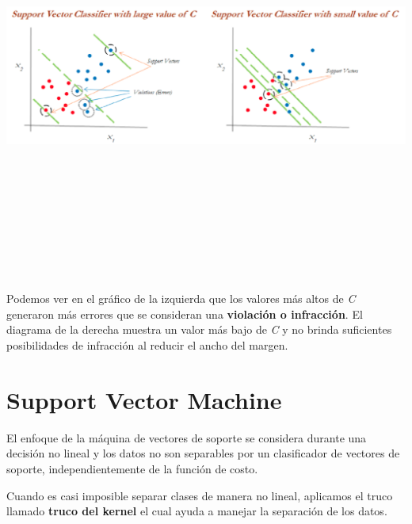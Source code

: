 \documentclass[
]{book}
\begin{document}
\begin{center}\includegraphics[width=900pt,height=380pt]{img/02-svm/03_support_vector_classifier} \end{center}

Podemos ver en el gráfico de la izquierda que los valores más altos de \emph{C} generaron más errores que se consideran una \textbf{violación o infracción}. El diagrama de la derecha muestra un valor más bajo de \emph{C} y no brinda suficientes posibilidades de infracción al reducir el ancho del margen.

\hypertarget{support-vector-machine}{%
\section{Support Vector Machine}\label{support-vector-machine}}

El enfoque de la máquina de vectores de soporte se considera durante una decisión no lineal y los datos no son separables por un clasificador de vectores de soporte, independientemente de la función de costo.

Cuando es casi imposible separar clases de manera no lineal, aplicamos el truco llamado \textbf{truco del kernel} el cual ayuda a manejar la separación de los datos.
\end{document}
